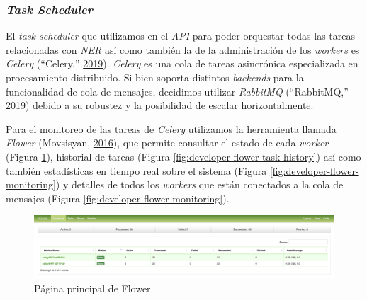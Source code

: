 \documentclass[12pt,a4paper,]{scrartcl}
\begin{document}
\hypertarget{task-scheduler-1}{%
\subsubsection{\texorpdfstring{\emph{Task Scheduler}}{Task Scheduler}}\label{task-scheduler-1}}

El \emph{task scheduler} que utilizamos en el \emph{API} para poder orquestar todas las tareas relacionadas con \emph{NER} así como también la de la administración de los \emph{workers} es \emph{Celery} (``Celery,'' \protect\hyperlink{ref-celery}{2019}). \emph{Celery} es una cola de tareas asincrónica especializada en procesamiento distribuido.
Si bien soporta distintos \emph{backends} para la funcionalidad de cola de mensajes, decidimos utilizar \emph{RabbitMQ} (``RabbitMQ,'' \protect\hyperlink{ref-rabbitmq}{2019}) debido a su robustez y la posibilidad de escalar horizontalmente.

Para el monitoreo de las tareas de \emph{Celery} utilizamos la herramienta llamada \emph{Flower} (Movsisyan, \protect\hyperlink{ref-flower}{2016}), que permite consultar el estado de cada \emph{worker} (Figura \ref{fig:developer-flower-dashboard}), historial de tareas (Figura \ref{fig:developer-flower-task-history}) así como también estadísticas en tiempo real sobre el sistema (Figura \ref{fig:developer-flower-monitoring}) y detalles de todos los \emph{workers} que están conectados a la cola de mensajes (Figura \ref{fig:developer-flower-monitoring}).

\begin{figure}[H]

{\centering \includegraphics{assets/developer/flower-dashboard.png} 

}

\caption{Página principal de Flower.}\label{fig:developer-flower-dashboard}
\end{figure}
\end{document}
